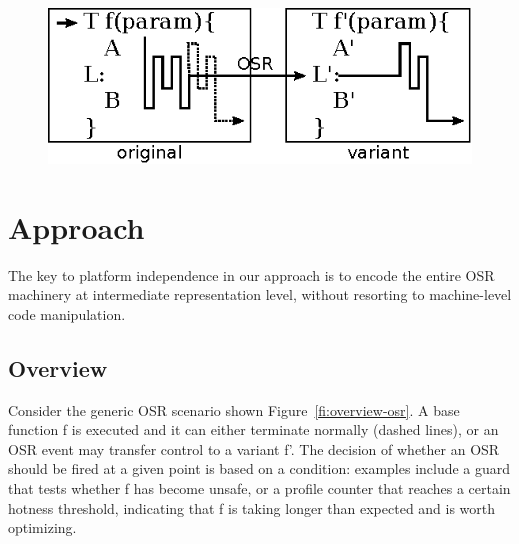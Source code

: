 
\ifdefined\noauthorea
\begin{figure}[t]
\begin{center}
\includegraphics[width=0.6\columnwidth]{figures/overview-osr/overview-osr.eps}
\caption{\protect}
\end{center}
\end{figure}
\fi

\section{Approach}
\label{se:approach}

The key to platform independence in our approach is to encode the entire OSR machinery at intermediate representation level, without resorting to machine-level code manipulation.

\subsection{Overview}
\label{ss:overview}

Consider the generic OSR scenario shown Figure~\ref{fi:overview-osr}. A base function \textsf{f} is executed and it can either terminate normally (dashed lines), or an OSR event may transfer control to a variant \textsf{f'}. The decision of whether an OSR should be fired at a given point is based on a condition: examples include a guard that tests whether \textsf{f} has become unsafe, or a profile counter that reaches a certain hotness threshold, indicating that \textsf{f} is taking longer than expected and is worth optimizing.


%
%

